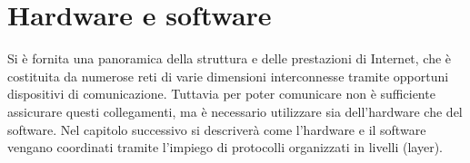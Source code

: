 \section{Hardware e software}

Si è fornita una panoramica della struttura e delle prestazioni di Internet, che è costituita da numerose reti di varie dimensioni interconnesse tramite opportuni dispositivi di comunicazione. Tuttavia per poter comunicare non è sufficiente assicurare questi collegamenti, ma è necessario utilizzare sia dell'hardware che del software. Nel capitolo successivo si descriverà come l'hardware e il software vengano coordinati tramite l'impiego di protocolli organizzati in livelli (layer).